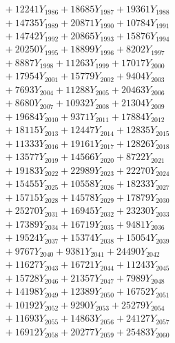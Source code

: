 \documentclass[a4paper,10pt]{article}
\begin{document}
{\begin{align}
&\;  + 12241 Y_{1986} + 18685 Y_{1987} + 19361 Y_{1988} \\[0.3ex]
&\;  + 14735 Y_{1989} + 20871 Y_{1990} + 10784 Y_{1991} \\[0.3ex]
&\;  + 14742 Y_{1992} + 20865 Y_{1993} + 15876 Y_{1994} \\[0.3ex]
&\;  + 20250 Y_{1995} + 18899 Y_{1996} + 8202 Y_{1997} \\[0.3ex]
&\;  + 8887 Y_{1998} + 11263 Y_{1999} + 17017 Y_{2000} \\[0.3ex]
&\;  + 17954 Y_{2001} + 15779 Y_{2002} + 9404 Y_{2003} \\[0.3ex]
&\;  + 7693 Y_{2004} + 11288 Y_{2005} + 20463 Y_{2006} \\[0.3ex]
&\;  + 8680 Y_{2007} + 10932 Y_{2008} + 21304 Y_{2009} \\[0.5ex]\allowbreak
&\;  + 19684 Y_{2010} + 9371 Y_{2011} + 17884 Y_{2012} \\[0.3ex]
&\;  + 18115 Y_{2013} + 12447 Y_{2014} + 12835 Y_{2015} \\[0.3ex]
&\;  + 11333 Y_{2016} + 19161 Y_{2017} + 12826 Y_{2018} \\[0.3ex]
&\;  + 13577 Y_{2019} + 14566 Y_{2020} + 8722 Y_{2021} \\[0.3ex]
&\;  + 19183 Y_{2022} + 22989 Y_{2023} + 22270 Y_{2024} \\[0.3ex]
&\;  + 15455 Y_{2025} + 10558 Y_{2026} + 18233 Y_{2027} \\[0.3ex]
&\;  + 15715 Y_{2028} + 14578 Y_{2029} + 17879 Y_{2030} \\[0.3ex]
&\;  + 25270 Y_{2031} + 16945 Y_{2032} + 23230 Y_{2033} \\[0.3ex]
&\;  + 17389 Y_{2034} + 16719 Y_{2035} + 9481 Y_{2036} \\[0.3ex]
&\;  + 19524 Y_{2037} + 15374 Y_{2038} + 15054 Y_{2039} \\[0.5ex]\allowbreak
&\;  + 9767 Y_{2040} + 9381 Y_{2041} + 24490 Y_{2042} \\[0.3ex]
&\;  + 11627 Y_{2043} + 16721 Y_{2044} + 11243 Y_{2045} \\[0.3ex]
&\;  + 15728 Y_{2046} + 21357 Y_{2047} + 7989 Y_{2048} \\[0.3ex]
&\;  + 14198 Y_{2049} + 12389 Y_{2050} + 16752 Y_{2051} \\[0.3ex]
&\;  + 10192 Y_{2052} + 9290 Y_{2053} + 25279 Y_{2054} \\[0.3ex]
&\;  + 11693 Y_{2055} + 14863 Y_{2056} + 24127 Y_{2057} \\[0.3ex]
&\;  + 16912 Y_{2058} + 20277 Y_{2059} + 25483 Y_{2060} \\[0.3ex]

\end{align}}
\end{document}
